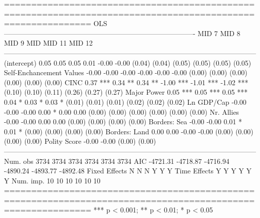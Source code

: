 
============================================================================================================
                                                                  OLS                                       
                          ----------------------------------------------------------------------------------
                          MID 7         MID 8         MID 9         MID           MID 11        MID 12      
------------------------------------------------------------------------------------------------------------
(intercept)                   0.05          0.05          0.05          0.01         -0.00         -0.00    
                             (0.04)        (0.04)        (0.05)        (0.05)        (0.05)        (0.05)   
Self-Enchancement Values     -0.00         -0.00         -0.00         -0.00         -0.00         -0.00    
                             (0.00)        (0.00)        (0.00)        (0.00)        (0.00)        (0.00)   
CINC                          0.37 ***      0.34 **       0.34 **      -1.00 ***     -1.01 ***     -1.02 ***
                             (0.10)        (0.10)        (0.11)        (0.26)        (0.27)        (0.27)   
Major Power                   0.05 ***      0.05 ***      0.05 ***      0.04 *        0.03 *        0.03 *  
                             (0.01)        (0.01)        (0.01)        (0.02)        (0.02)        (0.02)   
Ln GDP/Cap                   -0.00         -0.00         -0.00          0.00 *        0.00          0.00    
                             (0.00)        (0.00)        (0.00)        (0.00)        (0.00)        (0.00)   
Nr. Allies                                 -0.00         -0.00                        0.00          0.00    
                                           (0.00)        (0.00)                      (0.00)        (0.00)   
Borders: Sea                               -0.00         -0.00                        0.01 *        0.01 *  
                                           (0.00)        (0.00)                      (0.00)        (0.00)   
Borders: Land                               0.00          0.00                       -0.00         -0.00    
                                           (0.00)        (0.00)                      (0.00)        (0.00)   
Polity Score                                             -0.00                                     -0.00    
                                                         (0.00)                                    (0.00)   
------------------------------------------------------------------------------------------------------------
Num. obs                   3734          3734          3734          3734          3734          3734       
AIC                       -4721.31      -4718.87      -4716.94      -4890.24      -4893.77      -4892.48    
Fixed Effects                 N             N             N             Y             Y             Y       
Time Effects                  Y             Y             Y             Y             Y             Y       
Num. imp.                    10            10            10            10            10            10       
============================================================================================================
*** p < 0.001; ** p < 0.01; * p < 0.05
